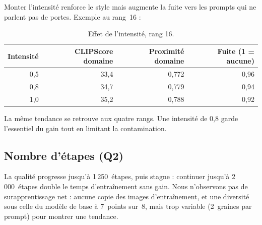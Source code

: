 \documentclass[11pt,a4paper]{article}
\begin{document}
Monter l'intensité renforce le style mais augmente la fuite vers les prompts qui ne parlent pas de portes. Exemple au rang~16 :

\begin{table}[H]
  \centering
  \caption{Effet de l'intensité, rang 16.}
  \small
  \begin{tabular}{rrrr}
    \toprule
    Intensité & CLIPScore domaine & Proximité domaine & Fuite (1 = aucune) \\
    \midrule
    0,5 & 33,4 & 0,772 & 0,96 \\
    \rowcolor{bleu!10} 0,8 & 34,7 & 0,779 & 0,94 \\
    1,0 & 35,2 & 0,788 & 0,92 \\
    \bottomrule
  \end{tabular}
\end{table}

La même tendance se retrouve aux quatre rangs. Une intensité de 0,8 garde l'essentiel du gain tout en limitant la contamination.

\subsection{Nombre d'étapes (Q2)}

La qualité progresse jusqu'à 1\,250~étapes, puis stagne : continuer jusqu'à 2\,000~étapes double le temps d'entraînement sans gain. Nous n'observons pas de surapprentissage net : aucune copie des images d'entraînement, et une diversité sous celle du modèle de base à 7~points sur~8, mais trop variable (2~graines par prompt) pour montrer une tendance.
\end{document}

